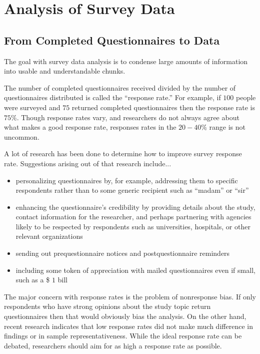 \section{Analysis of Survey Data}

\subsection{From Completed Questionnaires to Data}

The goal with survey data analysis is to condense large amounts of information into usable and understandable chunks. 

The number of completed questionnaires received divided by the number of questionnaires  distributed is called the ``response rate.'' For example, if $ 100 $ people were surveyed and $ 75 $ returned completed questionnaires then the response rate is $ 75\% $. Though response rates vary, and researchers do not always agree about what makes a good response rate, responses rates in the $ 20-40\% $ range is not uncommon. 

A lot of research has been done to determine how to improve survey response rate. Suggestions arising out of that research include...

\begin{itemize}
	\item personalizing questionnaires by, for example, addressing them to specific respondents rather than to some generic recipient such as ``madam'' or ``sir''
	\item enhancing the questionnaire's credibility by providing details about the study, contact information for the researcher, and perhaps partnering with agencies likely to be respected by respondents such as universities, hospitals, or other relevant organizations
	\item sending out prequestionnaire notices and postquestionnaire reminders
	\item including some token of appreciation with mailed questionnaires even if small, such as a \$ $ 1 $ bill 
\end{itemize}

The major concern with response rates is the problem of nonresponse bias. If only respondents who have strong opinions about the study topic return questionnaires then that would obviously bias the analysis. On the other hand, recent research indicates that low response rates did not make much difference in findings or in sample representativeness\cite{rindfuss2015low}\cite{wright2015empirical}. While the ideal response rate can be debated, researchers should aim for as high a response rate as possible.

